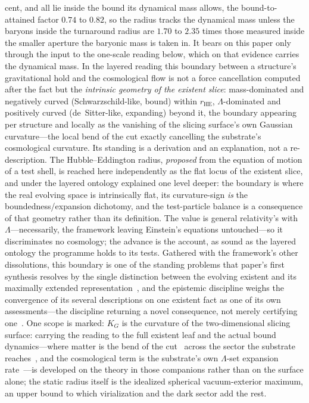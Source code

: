 \documentclass[11pt,a4paper]{article}
\theoremstyle{definition}
\begin{document}
cent, and all lie inside the bound its dynamical mass allows, the bound-to-attained factor $0.74$ to $0.82$, so the radius tracks the dynamical mass unless the baryons inside the turnaround radius are $1.70$ to $2.35$ times those measured inside the smaller aperture the baryonic mass is taken in. It bears on this paper only through the input to the one-scale reading below, which on that evidence carries the dynamical mass. In the layered reading this boundary between a structure's gravitational hold and the cosmological flow is not a force cancellation computed after the fact but the \emph{intrinsic geometry of the existent slice}: mass-dominated and negatively curved (Schwarzschild-like, bound) within $r_{\mathrm{HE}}$, $\Lambda$-dominated and positively curved (de~Sitter-like, expanding) beyond it, the boundary appearing per structure and locally as the vanishing of the slicing surface's own Gaussian curvature---the local bend of the cut exactly cancelling the substrate's cosmological curvature. Its standing is a derivation and an explanation, not a re-description. The Hubble--Eddington radius, \emph{proposed} from the equation of motion of a test shell, is reached here independently as the flat locus of the existent slice, and under the layered ontology explained one level deeper: the boundary is where the real evolving space is intrinsically flat, its curvature-sign \emph{is} the boundedness/expansion dichotomy, and the test-particle balance is a consequence of that geometry rather than its definition. The value is general relativity's with $\Lambda$---necessarily, the framework leaving Einstein's equations untouched---so it discriminates no cosmology; the advance is the account, as sound as the layered ontology the programme holds to its tests. Gathered with the framework's other dissolutions, this boundary is one of the standing problems that paper's first synthesis resolves by the single distinction between the evolving existent and its maximally extended representation~\cite{JanzenCRframework}, and the epistemic discipline weighs the convergence of its several descriptions on one existent fact as one of its own assessments---the discipline returning a novel consequence, not merely certifying one~\cite{JanzenShadowExistence}. One scope is marked: $K_{G}$ is the curvature of the two-dimensional slicing surface: carrying the reading to the full existent leaf and the actual bound dynamics---where matter is the bend of the cut~\cite{JanzenOperator} across the sector the substrate reaches~\cite{JanzenRange}, and the cosmological term is the substrate's own $\Lambda$-set expansion rate~\cite{JanzenCRcosmology}---is developed on the theory in those companions rather than on the surface alone; the static radius itself is the idealized spherical vacuum-exterior maximum, an upper bound to which virialization and the dark sector add the rest.
\end{document}
